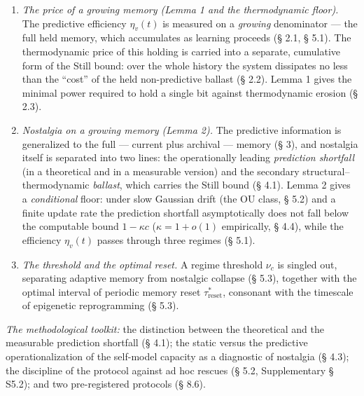 \documentclass[pdflatex,sn-mathphys-ay]{sn-jnl}
\begin{document}
\begin{enumerate}

\def\labelenumi{\arabic{enumi}.}

\item

  \emph{The price of a growing memory (Lemma 1 and the thermodynamic floor).} The predictive efficiency \(\eta_v(t)\) is measured on a \emph{growing} denominator --- the full held memory, which accumulates as learning proceeds (§ 2.1, § 5.1). The thermodynamic price of this holding is carried into a separate, cumulative form of the Still bound: over the whole history the system dissipates no less than the ``cost'' of the held non-predictive ballast (§ 2.2). Lemma 1 gives the minimal power required to hold a single bit against thermodynamic erosion (§ 2.3).

\item

  \emph{Nostalgia on a growing memory (Lemma 2).} The predictive information is generalized to the full --- current plus archival --- memory (§ 3), and nostalgia itself is separated into two lines: the operationally leading \emph{prediction shortfall} (in a theoretical and in a measurable version) and the secondary structural--thermodynamic \emph{ballast}, which carries the Still bound (§ 4.1). Lemma 2 gives a \emph{conditional} floor: under slow Gaussian drift (the OU class, § 5.2) and a finite update rate the prediction shortfall asymptotically does not fall below the computable bound \(1 - \kappa c\) (\(\kappa = 1 + o(1)\) empirically, § 4.4), while the efficiency \(\eta_v(t)\) passes through three regimes (§ 5.1).

\item

  \emph{The threshold and the optimal reset.} A regime threshold \(\nu_c\) is singled out, separating adaptive memory from nostalgic collapse (§ 5.3), together with the optimal interval of periodic memory reset \(\tau_{\text{reset}}^*\), consonant with the timescale of epigenetic reprogramming (§ 5.3).

\end{enumerate}



\emph{The methodological toolkit:} the distinction between the theoretical and the measurable prediction shortfall (§ 4.1); the static versus the predictive operationalization of the self-model capacity as a diagnostic of nostalgia (§ 4.3); the discipline of the protocol against ad hoc rescues (§ 5.2, Supplementary § S5.2); and two pre-registered protocols (§ 8.6).
\end{document}

